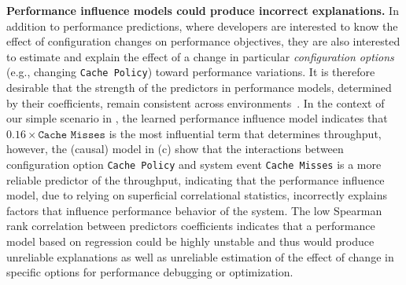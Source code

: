     
    

    
    \item \textbf{Performance influence models could produce incorrect explanations.} In addition to performance predictions, where developers are interested to know the effect of configuration changes on performance objectives, they are also interested to estimate and explain the effect of a change in particular \emph{configuration options} (e.g., changing \texttt{Cache Policy}) toward performance variations. It is therefore desirable that the strength of the predictors in performance models, determined by their coefficients, remain consistent across environments~\cite{ding2021generalizable,JSVKPA:ASE17}.  
    In the context of our simple scenario in , the learned performance influence model indicates that $0.16 \times \texttt{Cache Misses}$ is the most influential term that determines throughput, however, the (causal) model in (c) show that the interactions between configuration option \texttt{Cache Policy} and system event \texttt{Cache Misses} is a more reliable predictor of the throughput, indicating that the performance influence model, due to relying on superficial correlational statistics, incorrectly explains factors that influence performance behavior of the system. The low Spearman rank correlation between predictors coefficients indicates that a performance model based on regression could be highly unstable and thus would produce unreliable explanations as well as unreliable estimation of the effect of change in specific options for performance debugging or optimization.
\ee


